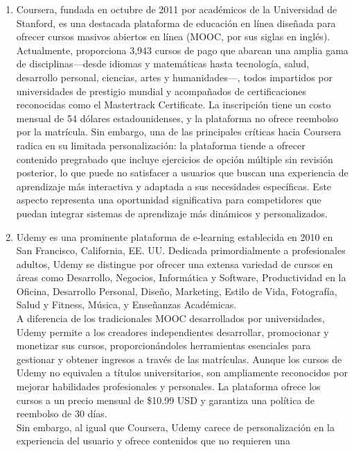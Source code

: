 \documentclass[
]{article}
\begin{document}
\begin{enumerate}
\def\labelenumi{\alph{enumi}.}
\item
  Coursera, fundada en octubre de 2011 por académicos de la Universidad
  de Stanford, es una destacada plataforma de educación en línea
  diseñada para ofrecer cursos masivos abiertos en línea (MOOC, por sus
  siglas en inglés). Actualmente, proporciona 3,943 cursos de pago que
  abarcan una amplia gama de disciplinas---desde idiomas y matemáticas
  hasta tecnología, salud, desarrollo personal, ciencias, artes y
  humanidades---, todos impartidos por universidades de prestigio
  mundial y acompañados de certificaciones reconocidas como el
  Mastertrack Certificate. La inscripción tiene un costo mensual de 54
  dólares estadounidenses, y la plataforma no ofrece reembolso por la
  matrícula. Sin embargo, una de las principales críticas hacia Coursera
  radica en su limitada personalización: la plataforma tiende a ofrecer
  contenido pregrabado que incluye ejercicios de opción múltiple sin
  revisión posterior, lo que puede no satisfacer a usuarios que buscan
  una experiencia de aprendizaje más interactiva y adaptada a sus
  necesidades específicas. Este aspecto representa una oportunidad
  significativa para competidores que puedan integrar sistemas de
  aprendizaje más dinámicos y personalizados.
\item
  Udemy es una prominente plataforma de e-learning establecida en 2010
  en San Francisco, California, EE. UU. Dedicada primordialmente a
  profesionales adultos, Udemy se distingue por ofrecer una extensa
  variedad de cursos en áreas como Desarrollo, Negocios, Informática y
  Software, Productividad en la Oficina, Desarrollo Personal, Diseño,
  Marketing, Estilo de Vida, Fotografía, Salud y Fitness, Música, y
  Enseñanzas Académicas.\\
  A diferencia de los tradicionales MOOC desarrollados por
  universidades, Udemy permite a los creadores independientes
  desarrollar, promocionar y monetizar sus cursos, proporcionándoles
  herramientas esenciales para gestionar y obtener ingresos a través de
  las matrículas. Aunque los cursos de Udemy no equivalen a títulos
  universitarios, son ampliamente reconocidos por mejorar habilidades
  profesionales y personales. La plataforma ofrece los cursos a un
  precio mensual de \$10.99 USD y garantiza una política de reembolso de
  30 días.\\
  Sin embargo, al igual que Coursera, Udemy carece de personalización en
  la experiencia del usuario y ofrece contenidos que no requieren una

\end{enumerate}
\end{document}
